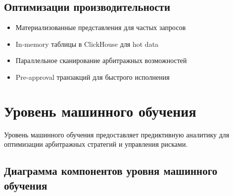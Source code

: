 \documentclass[a4paper,11pt]{article}
\begin{document}
\subsection{Оптимизации производительности}

\begin{itemize}
    \item Материализованные представления для частых запросов
    \item In-memory таблицы в ClickHouse для hot data
    \item Параллельное сканирование арбитражных возможностей
    \item Pre-approval транзакций для быстрого исполнения
\end{itemize}

\newpage

\section{Уровень машинного обучения}

Уровень машинного обучения предоставляет предиктивную аналитику для оптимизации арбитражных стратегий и управления рисками.

\subsection{Диаграмма компонентов уровня машинного обучения}
\end{document}
